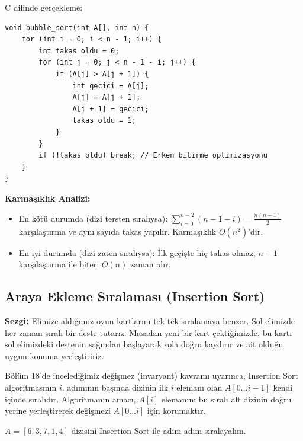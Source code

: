C dilinde gerçekleme:
\begin{lstlisting}[language=CTemel]
void bubble_sort(int A[], int n) {
    for (int i = 0; i < n - 1; i++) {
        int takas_oldu = 0;
        for (int j = 0; j < n - 1 - i; j++) {
            if (A[j] > A[j + 1]) {
                int gecici = A[j];
                A[j] = A[j + 1];
                A[j + 1] = gecici;
                takas_oldu = 1;
            }
        }
        if (!takas_oldu) break; // Erken bitirme optimizasyonu
    }
}
\end{lstlisting}

\textbf{Karmaşıklık Analizi:}
\begin{itemize}
    \item En kötü durumda (dizi tersten sıralıysa): $\sum_{i=0}^{n-2} (n - 1 - i) = \frac{n(n-1)}{2}$ karşılaştırma ve aynı sayıda takas yapılır. Karmaşıklık $O(n^2)$'dir.
    \item En iyi durumda (dizi zaten sıralıysa): İlk geçişte hiç takas olmaz, $n-1$ karşılaştırma ile biter; $O(n)$ zaman alır.
\end{itemize}

\subsection{Araya Ekleme Sıralaması (Insertion Sort)}

\textbf{Sezgi:} Elimize aldığımız oyun kartlarını tek tek sıralamaya benzer. Sol elimizde her zaman sıralı bir deste tutarız. Masadan yeni bir kart çektiğimizde, bu kartı sol elimizdeki destenin sağından başlayarak sola doğru kaydırır ve ait olduğu uygun konuma yerleştiririz.

\begin{definition}
Bölüm 18'de incelediğimiz değişmez (invaryant) kavramı uyarınca, Insertion Sort algoritmasının $i$. adımının başında dizinin ilk $i$ elemanı olan $A[0 \dots i-1]$ kendi içinde sıralıdır. Algoritmanın amacı, $A[i]$ elemanını bu sıralı alt dizinin doğru yerine yerleştirerek değişmezi $A[0 \dots i]$ için korumaktır.
\end{definition}

\begin{example}
$A = [6, 3, 7, 1, 4]$ dizisini Insertion Sort ile adım adım sıralayalım.
\end{example}

